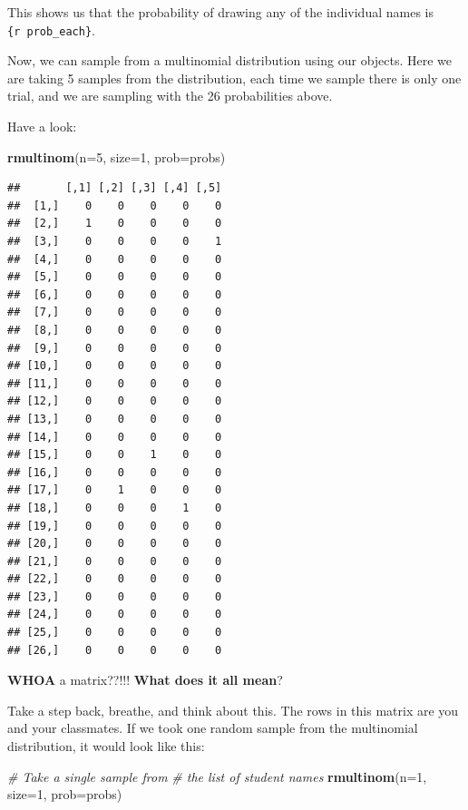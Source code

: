 \documentclass[
]{book}
\newenvironment{Shaded}{\begin{snugshade}}{\end{snugshade}}
\newcommand{\CommentTok}[1]{\textcolor[rgb]{0.56,0.35,0.01}{\textit{#1}}}
\newcommand{\DataTypeTok}[1]{\textcolor[rgb]{0.13,0.29,0.53}{#1}}
\newcommand{\DecValTok}[1]{\textcolor[rgb]{0.00,0.00,0.81}{#1}}
\newcommand{\KeywordTok}[1]{\textcolor[rgb]{0.13,0.29,0.53}{\textbf{#1}}}
\newcommand{\NormalTok}[1]{#1}
\begin{document}
This shows us that the probability of drawing any of the individual names is \texttt{\{r\ prob\_each\}}.

Now, we can sample from a multinomial distribution using our objects. Here we are taking 5 samples from the distribution, each time we sample there is only one trial, and we are sampling with the 26 probabilities above.

Have a look:

\begin{Shaded}
\begin{Highlighting}[]
\KeywordTok{rmultinom}\NormalTok{(}\DataTypeTok{n=}\DecValTok{5}\NormalTok{, }\DataTypeTok{size=}\DecValTok{1}\NormalTok{, }\DataTypeTok{prob=}\NormalTok{probs)}
\end{Highlighting}
\end{Shaded}

\begin{verbatim}
##       [,1] [,2] [,3] [,4] [,5]
##  [1,]    0    0    0    0    0
##  [2,]    1    0    0    0    0
##  [3,]    0    0    0    0    1
##  [4,]    0    0    0    0    0
##  [5,]    0    0    0    0    0
##  [6,]    0    0    0    0    0
##  [7,]    0    0    0    0    0
##  [8,]    0    0    0    0    0
##  [9,]    0    0    0    0    0
## [10,]    0    0    0    0    0
## [11,]    0    0    0    0    0
## [12,]    0    0    0    0    0
## [13,]    0    0    0    0    0
## [14,]    0    0    0    0    0
## [15,]    0    0    1    0    0
## [16,]    0    0    0    0    0
## [17,]    0    1    0    0    0
## [18,]    0    0    0    1    0
## [19,]    0    0    0    0    0
## [20,]    0    0    0    0    0
## [21,]    0    0    0    0    0
## [22,]    0    0    0    0    0
## [23,]    0    0    0    0    0
## [24,]    0    0    0    0    0
## [25,]    0    0    0    0    0
## [26,]    0    0    0    0    0
\end{verbatim}

\textbf{WHOA} a matrix??!!! \textbf{What does it all mean}?

Take a step back, breathe, and think about this. The rows in this matrix are you and your classmates. If we took one random sample from the multinomial distribution, it would look like this:

\begin{Shaded}
\begin{Highlighting}[]
\CommentTok{# Take a single sample from}
\CommentTok{# the list of student names    }
\KeywordTok{rmultinom}\NormalTok{(}\DataTypeTok{n=}\DecValTok{1}\NormalTok{, }\DataTypeTok{size=}\DecValTok{1}\NormalTok{, }\DataTypeTok{prob=}\NormalTok{probs)}
\end{Highlighting}
\end{Shaded}
\end{document}
